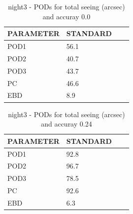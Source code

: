 \begin{table}[p!]
\begin{center}
\begin{tabular}{|l|l|l|l|}
\hline
\multicolumn{1}{|c|}{\cellcolor[HTML]{C0C0C0}\textbf{PARAMETER}} & \multicolumn{1}{c|}{\cellcolor[HTML]{C0C0C0}\textbf{STANDARD}}\\
\hline
\cellcolor[HTML]{C0C0C0}POD1  & 56.1                                \\
\cellcolor[HTML]{C0C0C0}POD2  & 40.7                                \\
\cellcolor[HTML]{C0C0C0}POD3  & 43.7                                \\
\cellcolor[HTML]{C0C0C0}PC    & 46.6                                  \\
\cellcolor[HTML]{C0C0C0}EBD   & 8.9                                 \\
\hline
\end{tabular}
\caption{night3 - PODs for total seeing (arcsec) and accuray 0.0}
\label{tab:podsee0.0:night3}
\end{center}
\end{table}
\begin{table}[p!]
\begin{center}
\begin{tabular}{|l|l|l|l|}
\hline
\multicolumn{1}{|c|}{\cellcolor[HTML]{C0C0C0}\textbf{PARAMETER}} & \multicolumn{1}{c|}{\cellcolor[HTML]{C0C0C0}\textbf{STANDARD}}\\
\hline
\cellcolor[HTML]{C0C0C0}POD1  & 92.8                                \\
\cellcolor[HTML]{C0C0C0}POD2  & 96.7                                \\
\cellcolor[HTML]{C0C0C0}POD3  & 78.5                                \\
\cellcolor[HTML]{C0C0C0}PC    & 92.6                                  \\
\cellcolor[HTML]{C0C0C0}EBD   & 6.3                                 \\
\hline
\end{tabular}
\caption{night3 - PODs for total seeing (arcsec) and accuray 0.24}
\label{tab:podsee0.24:night3}
\end{center}
\end{table}
